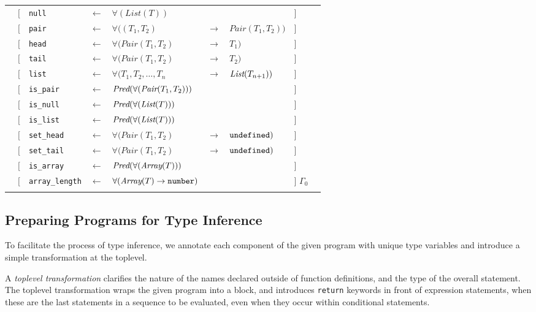 \begin{tabular}[fragile]{lllllllll}
& $[$ & \texttt{null}      & $\leftarrow$  & $\forall(List(T))$ & & & $]$ \\
& $[$ & \texttt{pair} & $\leftarrow$  & $\forall((T_1,T_2)$ & $\rightarrow$ & $Pair(T_1,T_2))$ & $]$ \\
& $[$ & \texttt{head} & $\leftarrow$  & $\forall(Pair(T_1,T_2)$ & $\rightarrow$ & $T_1)$ & $]$ \\
& $[$ & \texttt{tail} & $\leftarrow$  & $\forall(Pair(T_1,T_2)$ & $\rightarrow$ & $T_2)$ & $]$ \\
& $[$ & \texttt{list} & $\leftarrow$  & $\forall(T_1,T_2,\dots,T_n$ & $\rightarrow$ & $\textit{List}(T_{n+1}))$ & $]$ \\
& $[$ & \texttt{is\_pair} & $\leftarrow$  & $\textit{Pred}(\forall(\textit{Pair}(T_1, T_2)))$ & & & $]$ \\
& $[$ & \texttt{is\_null} & $\leftarrow$  & $\textit{Pred}(\forall(\textit{List}(T)))$ & & & $]$ \\
& $[$ & \texttt{is\_list} & $\leftarrow$  & $\textit{Pred}(\forall(\textit{List}(T)))$ & & & $]$ \\
& $[$ & \texttt{set\_head} & $\leftarrow$  & $\forall(Pair(T_1,T_2)$ & $\rightarrow$ & $\texttt{undefined})$ & $]$ \\
& $[$ & \texttt{set\_tail} & $\leftarrow$  & $\forall(Pair(T_1,T_2)$ & $\rightarrow$ & $\texttt{undefined})$ & $]$ \\
& $[$ & \texttt{is\_array} & $\leftarrow$  & $\textit{Pred}(\forall(\textit{Array}(T)))$ & & & $]$ \\
& $[$ & \texttt{array\_length} & $\leftarrow$  & $\forall(\textit{Array}(T) \rightarrow \texttt{number})$ & & & $]$ $\Gamma_0$ \\
& \end{tabular}
 
\subsection{Preparing Programs for Type Inference}

To facilitate the process of type inference, we annotate each component of the given
program with unique type variables and introduce a simple transformation at the toplevel.

A \emph{toplevel transformation} clarifies the nature
of the names declared outside of function definitions,
and the type of the overall statement. The toplevel
transformation wraps the given program into a block, and introduces \lstinline{return}
keywords in front of expression statements, when these are the last statements in a
sequence to be evaluated, even when they occur within conditional statements.

